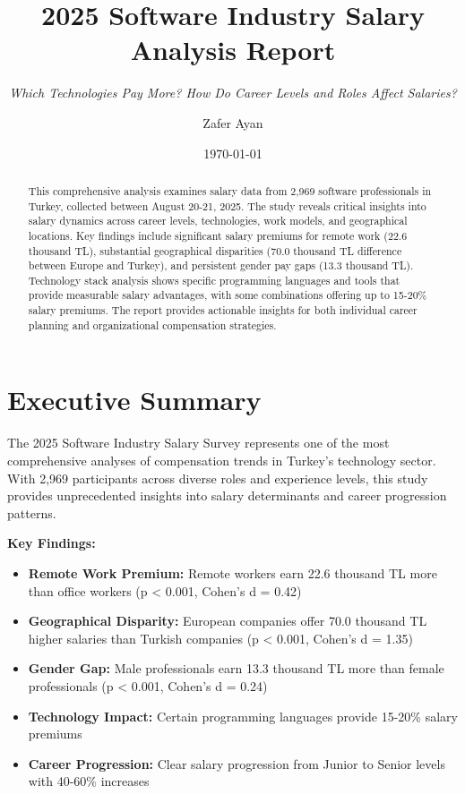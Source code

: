 \documentclass[12pt,a4paper]{article}
\title{\textbf{2025 Software Industry Salary Analysis Report}}
\subtitle{\textit{Which Technologies Pay More? How Do Career Levels and Roles Affect Salaries?}}
\author{Zafer Ayan}
\date{\today}
\begin{document}
\maketitle

\begin{abstract}
This comprehensive analysis examines salary data from 2,969 software professionals in Turkey, collected between August 20-21, 2025. The study reveals critical insights into salary dynamics across career levels, technologies, work models, and geographical locations. Key findings include significant salary premiums for remote work (22.6 thousand TL), substantial geographical disparities (70.0 thousand TL difference between Europe and Turkey), and persistent gender pay gaps (13.3 thousand TL). Technology stack analysis shows specific programming languages and tools that provide measurable salary advantages, with some combinations offering up to 15-20\% salary premiums. The report provides actionable insights for both individual career planning and organizational compensation strategies.
\end{abstract}

\section{Executive Summary}

The 2025 Software Industry Salary Survey represents one of the most comprehensive analyses of compensation trends in Turkey's technology sector. With 2,969 participants across diverse roles and experience levels, this study provides unprecedented insights into salary determinants and career progression patterns.

\textbf{Key Findings:}
\begin{itemize}
    \item \textbf{Remote Work Premium:} Remote workers earn 22.6 thousand TL more than office workers (p < 0.001, Cohen's d = 0.42)
    \item \textbf{Geographical Disparity:} European companies offer 70.0 thousand TL higher salaries than Turkish companies (p < 0.001, Cohen's d = 1.35)
    \item \textbf{Gender Gap:} Male professionals earn 13.3 thousand TL more than female professionals (p < 0.001, Cohen's d = 0.24)
    \item \textbf{Technology Impact:} Certain programming languages provide 15-20\% salary premiums
    \item \textbf{Career Progression:} Clear salary progression from Junior to Senior levels with 40-60\% increases
\end{itemize}
\end{document}
